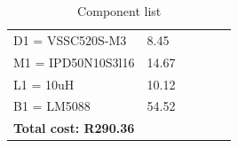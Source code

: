 \begin{table}[H]
{\begin{tabular}{|l|l|l|l|l|l|}
         D1 = VSSC520S-M3       &8.45&                      &&                           &\\   
         M1 = IPD50N10S3l16  &14.67&                       &&                           &\\                                          
         L1 = 10uH              &10.12&                       &&                           &\\    
         B1 = LM5088            &54.52&                       &&                           &\\  
         \hline
         \textbf{Total cost: R290.36}&&&&&\\
         \hline
    \end{tabular}}
    \caption{Component list}
\end{table}
\vspace{-10mm}
